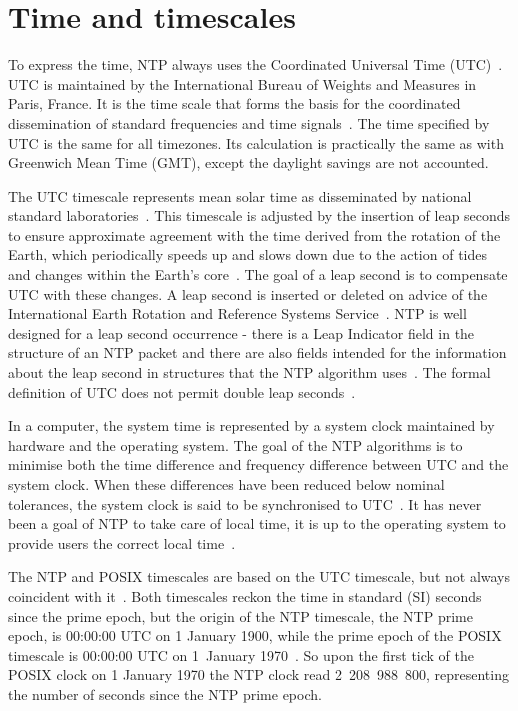 
\section{Time and timescales}\label{sec:ntp-time}
To express the time, NTP always uses the Coordinated Universal Time (UTC)~\cite{rfc5905}.
UTC is maintained by the International Bureau of Weights and Measures in Paris, France.
It is the time scale that forms the basis for the coordinated dissemination
of standard frequencies and time signals~\cite{bipm-utc}.
The time specified by UTC is the same for all timezones.
Its calculation is practically the same as with Greenwich Mean Time (GMT),
except the daylight savings are not accounted.

The UTC timescale represents mean solar time as disseminated by national
standard laboratories~\cite{rfc5905}.
This timescale is adjusted by the insertion of leap seconds to ensure approximate
agreement with the time derived from the rotation of the Earth,
which periodically speeds up and slows down due to the action
of tides and changes within the Earth's core~\cite{bipm-utc}.
The goal of a leap second is to compensate UTC with these changes.
A leap second is inserted or deleted on advice of the
International Earth Rotation and Reference Systems Service~\cite{bipm-utc}.
NTP is well designed for a leap second occurrence -
there is a Leap Indicator field
in the structure of an NTP packet and there are also fields intended for
the information about the leap second in structures that the NTP algorithm uses~\cite{rfc5905}.
The formal definition of UTC does not permit double leap seconds~\cite{posix}.

In a computer, the system time is represented by a system clock maintained by
hardware and the operating system.
The goal of the NTP algorithms is to minimise
both the time difference and frequency difference between UTC and the system clock.
When these differences have been reduced below nominal
tolerances, the system clock is said to be synchronised to UTC~\cite{rfc5905}.
It has never been a goal of NTP to take care of local time,
it is up to the operating system to provide users the correct local time~\cite{ntp-overview}.

The NTP and POSIX timescales are based on the UTC timescale,
but not always coincident with it~\cite{ntp-leap}.
Both timescales reckon the time in standard (SI) seconds since the prime epoch,
but the origin of the NTP timescale, the NTP prime epoch, is 00:00:00 UTC on 1 January 1900,
while the prime epoch of the POSIX timescale is 00:00:00 UTC on 1~January 1970~\cite{ntp-leap}.
So upon the first tick of the POSIX clock on 1 January 1970 the NTP clock read 2~208~988~800,
representing the number of seconds since the NTP prime epoch.
